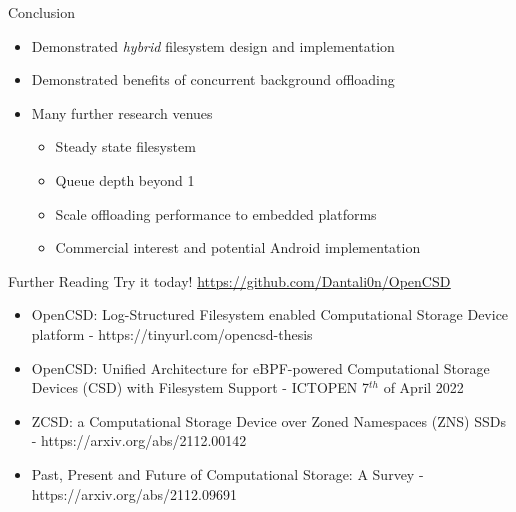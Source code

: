 \documentclass{beamer}
\begin{document}
\begin{frame}{Conclusion}
	\begingroup
	\small
	\begin{itemize}
		\item Demonstrated \textit{hybrid} filesystem design and implementation
		\item Demonstrated benefits of concurrent background offloading
		\item Many further research venues
		\begin{itemize}
			\item Steady state filesystem
			\item Queue depth beyond  1
			\item Scale offloading performance to embedded platforms
			\item Commercial interest and potential Android implementation
		\end{itemize}
	\end{itemize}
	\endgroup
\end{frame}

\begin{frame}{Further Reading}
	\begingroup
	\small Try it today! \underline{\url{https://github.com/Dantali0n/OpenCSD}}
	\begin{itemize}
		\item OpenCSD: Log-Structured Filesystem enabled Computational
		Storage Device platform - https://tinyurl.com/opencsd-thesis
		\item OpenCSD: Unified Architecture for eBPF-powered
			  Computational Storage Devices (CSD) with Filesystem Support -
			  ICTOPEN 7$^{th}$ of April 2022
		\item ZCSD: a Computational Storage Device over Zoned Namespaces (ZNS)
			  SSDs - https://arxiv.org/abs/2112.00142
		\item Past, Present and Future of Computational Storage: A Survey
			- https://arxiv.org/abs/2112.09691
	\end{itemize}
	\endgroup
\end{frame}
\end{document}
